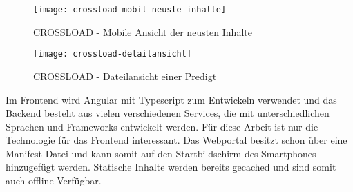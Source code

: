 \begin{figure}[ht]
  \centering
  \texttt{[image: crossload-mobil-neuste-inhalte]}
  \caption{CROSSLOAD - Mobile Ansicht der neusten Inhalte}
  \label{Kap3:crossload-mobil-neuste-inhalte}
\end{figure}

\begin{figure}[ht]
  \centering
  \texttt{[image: crossload-detailansicht]}
  \caption{CROSSLOAD - Dateilansicht einer Predigt}
  \label{Kap3:crossload-mobil-detail}
\end{figure}

Im Frontend wird Angular mit Typescript zum Entwickeln verwendet und das Backend besteht aus vielen verschiedenen Services, die mit unterschiedlichen Sprachen und Frameworks entwickelt werden. Für diese Arbeit ist nur die Technologie für das Frontend interessant. Das Webportal besitzt schon über eine Manifest-Datei und kann somit auf den Startbildschirm des Smartphones hinzugefügt werden. Statische Inhalte werden bereits gecached und sind somit auch offline Verfügbar. 
